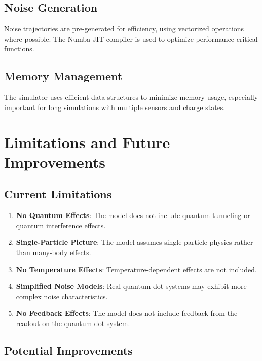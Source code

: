 \documentclass[11pt,a4paper]{article}
\begin{document}
\subsection{Noise Generation}

Noise trajectories are pre-generated for efficiency, using vectorized operations where possible. The Numba JIT compiler is used to optimize performance-critical functions.

\subsection{Memory Management}

The simulator uses efficient data structures to minimize memory usage, especially important for long simulations with multiple sensors and charge states.

\section{Limitations and Future Improvements}

\subsection{Current Limitations}

\begin{enumerate}
\item \textbf{No Quantum Effects}: The model does not include quantum tunneling or quantum interference effects.
\item \textbf{Single-Particle Picture}: The model assumes single-particle physics rather than many-body effects.
\item \textbf{No Temperature Effects}: Temperature-dependent effects are not included.
\item \textbf{Simplified Noise Models}: Real quantum dot systems may exhibit more complex noise characteristics.
\item \textbf{No Feedback Effects}: The model does not include feedback from the readout on the quantum dot system.
\end{enumerate}

\subsection{Potential Improvements}
\end{document}
